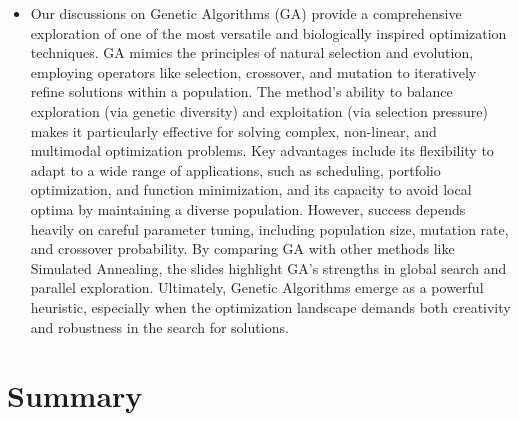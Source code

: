 \documentclass[
  letterpaper,
  DIV=11,
  numbers=noendperiod]{scrreprt}
\providecommand{\tightlist}{%
  \setlength{\itemsep}{0pt}\setlength{\parskip}{0pt}}\usepackage{longtable,booktabs,array}
\begin{document}
\begin{itemize}
\tightlist
\item
  Our discussions on Genetic Algorithms (GA) provide a comprehensive
  exploration of one of the most versatile and biologically inspired
  optimization techniques. GA mimics the principles of natural selection
  and evolution, employing operators like selection, crossover, and
  mutation to iteratively refine solutions within a population. The
  method's ability to balance exploration (via genetic diversity) and
  exploitation (via selection pressure) makes it particularly effective
  for solving complex, non-linear, and multimodal optimization problems.
  Key advantages include its flexibility to adapt to a wide range of
  applications, such as scheduling, portfolio optimization, and function
  minimization, and its capacity to avoid local optima by maintaining a
  diverse population. However, success depends heavily on careful
  parameter tuning, including population size, mutation rate, and
  crossover probability. By comparing GA with other methods like
  Simulated Annealing, the slides highlight GA's strengths in global
  search and parallel exploration. Ultimately, Genetic Algorithms emerge
  as a powerful heuristic, especially when the optimization landscape
  demands both creativity and robustness in the search for solutions.
\end{itemize}


\chapter{Summary}\label{summary}
\end{document}
